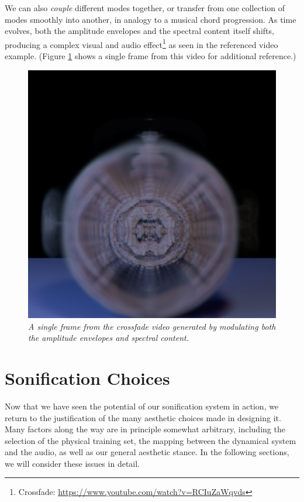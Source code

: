 We can also {\em couple} different modes together, or transfer from one collection of modes smoothly into another, in analogy to a musical chord progression. As time evolves, both the amplitude envelopes and the
spectral content itself shifts, producing a complex visual and audio effect\footnote{Crossfade: \url{https://www.youtube.com/watch?v=RCIuZaWqvds}} as seen in the referenced video example. (Figure \ref{fig:cross} shows 
a single frame from this video for additional reference.)

\begin{figure}[H]
	\centering
	\includegraphics[width=\textwidth]{chap6/figures/cross.png}
	\caption{\em A single frame from the crossfade video generated by modulating both the amplitude envelopes and spectral content.}
\label{fig:cross}
\end{figure}

\section{Sonification Choices}
Now that we have seen the potential of our sonification system in action, we return to the justification of the many aesthetic choices made in designing it. Many factors along the way are in principle somewhat arbitrary, including the selection of the physical training set, the mapping between the dynamical system and the audio, as well as our general aesthetic stance. In the following sections, we will consider these issues in detail.

